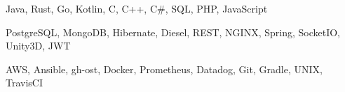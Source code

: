 
\begin{cvskills}

   {Java, Rust, Go, Kotlin, C, C++, C\#, SQL, PHP,
    JavaScript}

   {PostgreSQL, MongoDB, Hibernate, Diesel, REST, NGINX,
    Spring, SocketIO, Unity3D, JWT}

   {AWS, Ansible, gh-ost, Docker, Prometheus, Datadog, Git,
    Gradle, UNIX, TravisCI}
  
\end{cvskills}
